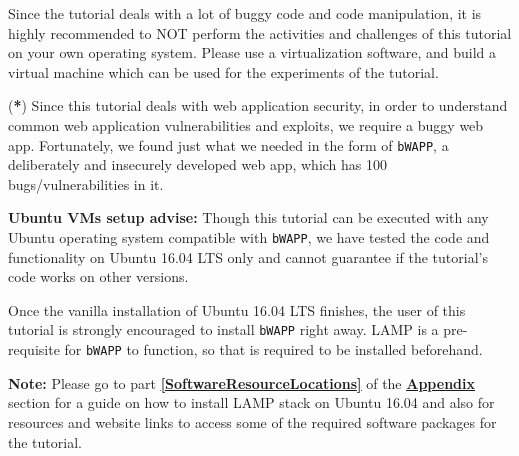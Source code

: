 \documentclass[12pt]{extarticle}
\begin{document}
\vspace{4mm}
\noindent
Since the tutorial deals with a lot of buggy code and code manipulation, it is highly recommended to NOT perform the activities and challenges of this tutorial on your own operating system. Please use a virtualization software, and build a virtual machine which can be used for the experiments of the tutorial.

\vspace{4mm}
\noindent
(\textbf{*}) Since this tutorial deals with web application security, in order to understand common web application vulnerabilities and exploits, we require a buggy web app. Fortunately, we found just what we needed in the form of \texttt{bWAPP}, a deliberately and insecurely developed web app, which has 100 bugs/vulnerabilities in it. 

\vspace{6mm}
\noindent
\label{UbuntuSetup}
\textbf{Ubuntu VMs setup advise:} Though this tutorial can be executed with any Ubuntu operating system compatible with \texttt{bWAPP}, we have tested the code and functionality on Ubuntu 16.04 LTS only and cannot guarantee if the tutorial's code works on other versions. 

\vspace{4mm}
\noindent
Once the vanilla installation of Ubuntu 16.04 LTS finishes, the user of this tutorial is strongly encouraged to install \texttt{bWAPP} right away. LAMP is a pre-requisite for \texttt{bWAPP} to function, so that is required to be installed beforehand. 

\vspace{6mm}
\noindent
\textbf{Note:} Please go to part \textbf{\underline{\ref{SoftwareResourceLocations}}} of the {\textbf{\hyperref[slide 22]{\underline{Appendix}}}} section for a guide on how to install LAMP stack on Ubuntu 16.04 and also for resources and website links to access some of the required software packages for the tutorial.  



\end{document}
